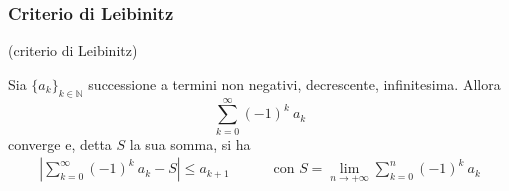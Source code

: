 \subsubsection{Criterio di Leibinitz}
\begin{theorem} (criterio di Leibinitz)
	
	Sia $\{a_k\}_{k\in \mathbb{N}}$ successione a termini non negativi, decrescente, infinitesima. Allora
	\begin{equation*}
		\sum_{k=0}^{\infty} (-1)^k \ a_k 
	\end{equation*}
	converge e, detta $S$ la sua somma, si ha
	\begin{align*}
		\left| \sum_{k=0}^{\infty} (-1)^k \ a_k - S \right| \leq a_{k+1} & \qquad \text{ con } S = \lim_{n \rightarrow +\infty} \sum_{k=0}^{n} (-1)^k \ a_k
	\end{align*}
\end{theorem}




